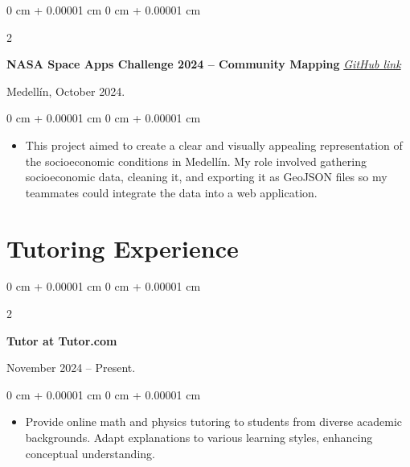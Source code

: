 \documentclass[10pt, letterpaper]{article}
\newenvironment{highlights}{
    \begin{itemize}[
        topsep=0.10 cm,
        parsep=0.10 cm,
        partopsep=0pt,
        itemsep=0pt,
        leftmargin=0 cm + 10pt
    ]
}{
    \end{itemize}
}
\newenvironment{onecolentry}{
    \begin{adjustwidth}{
        0 cm + 0.00001 cm
    }{
        0 cm + 0.00001 cm
    }
}{
    \end{adjustwidth}
}
\newenvironment{twocolentry}[2][]{
    \onecolentry
    \def\secondColumn{#2}
    \setcolumnwidth{\fill, 4.5 cm}
    \begin{paracol}{2}
}{
    \switchcolumn \raggedleft \secondColumn
    \end{paracol}
    \endonecolentry
}
\begin{document}
    \begin{twocolentry}{
        Medellín, October 2024.
    }
        \textbf{NASA Space Apps Challenge 2024 -- Community Mapping} 
        \textit{\href{https://github.com/tonnysoyyo/NASA-Space-Apps}{GitHub link}}
    \end{twocolentry}

    \vspace{0.10 cm}
    \begin{onecolentry}
        \begin{highlights}
            \item This project aimed to create a clear and visually appealing representation of the socioeconomic conditions in Medellín. My role involved gathering socioeconomic data, cleaning it, and exporting it as GeoJSON files so my teammates could integrate the data into a web application.
        \end{highlights}
    \end{onecolentry}

    \section{Tutoring Experience}
    \begin{twocolentry}{
        November 2024 – Present.
    }
        \textbf{Tutor at Tutor.com}
    \end{twocolentry}

    \vspace{0.10 cm}
    \begin{onecolentry}
        \begin{highlights}
            \item Provide online math and physics tutoring to students from diverse academic backgrounds. Adapt explanations to various learning styles, enhancing conceptual understanding.
        \end{highlights}
    \end{onecolentry}
\end{document}
